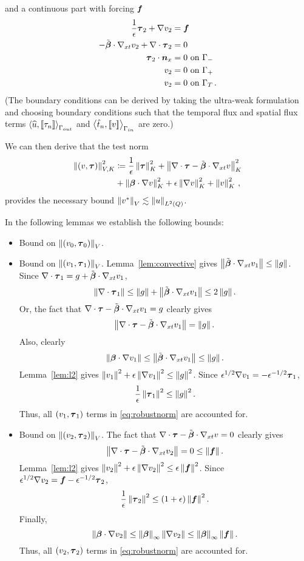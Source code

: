 \documentclass{article}
\begin{document}
and a continuous part with forcing $\boldsymbol f$
\begin{align*}
\frac{1}{\epsilon}\boldsymbol\tau_2+\nabla v_2 &=\boldsymbol f\\
-\tilde{\boldsymbol\beta}\cdot\nabla_{xt} v_2 + \nabla\cdot\boldsymbol\tau_2 &= 0\\
\boldsymbol\tau_2\cdot\boldsymbol n_x &= 0 \text{ on } \Gamma_-\\
v_2 &= 0 \text{ on } \Gamma_+\\
v_2 &= 0 \text{ on } \Gamma_T\,.
\end{align*}
(The boundary conditions can be derived by taking the ultra-weak formulation and choosing boundary conditions such that the temporal flux and spatial flux terms $\left\langle \widehat{u}, \left[ \![\tau_n]\! \right] \right\rangle_{\Gamma_{out}}$ and $\left\langle \hat t_n,\left[ \![v]\! \right] \right\rangle_{\Gamma_{in}}$ are zero.)

We can then derive that the test norm
\begin{align}
\label{eq:robustnorm}
\left\| \left( v,\boldsymbol\tau \right) \right\|_{V,K}^2 &\coloneqq
\frac{1}{\epsilon}\left\| \boldsymbol\tau \right\|_K^2
+ \left\| \nabla\cdot \boldsymbol\tau - \tilde{\boldsymbol\beta}\cdot\nabla_{xt} v \right\|_K^2 \nonumber\\
&+\left\| \boldsymbol\beta\cdot \nabla v \right\|_K^2
+ \epsilon\left\| \nabla v \right\|_K^2
+ \left\| v \right\|^2_K\,,
\end{align}
provides the necessary bound $\left\| v^* \right\|_V \lesssim \left\| u \right\|_{L^2\left( Q \right)}$.

In the following lemmas we establish the following bounds:
\begin{itemize}
\item Bound on $\left\| \left( v_0,\boldsymbol\tau_0 \right) \right\|_V$.
\item Bound on $\left\| \left( v_1,\boldsymbol\tau_1 \right) \right\|_V$. 
Lemma~\ref{lem:convective} gives $\left\| \tilde{\boldsymbol\beta}\cdot\nabla_{xt} v_1 \right\|\leq\left\| g \right\|$.
Since $\nabla\cdot\boldsymbol\tau_1=g+\tilde{\boldsymbol\beta}\cdot\nabla_{xt} v_1$, 
\[
\left\| \nabla\cdot\boldsymbol\tau_1 \right\|\leq\left\| g \right\|+\left\| \tilde{\boldsymbol\beta}\cdot\nabla_{xt} v_1 \right\|\leq 2\left\| g \right\|.
\]
Or, the fact that $\nabla\cdot\boldsymbol\tau-\tilde{\boldsymbol\beta}\cdot\nabla_{xt} v_1=g$ clearly gives
\[
\left\| \nabla\cdot \boldsymbol\tau - \tilde{\boldsymbol\beta}\cdot\nabla_{xt} v_1 \right\|=\left\| g \right\|.
\]
Also, clearly
\[
\left\| \boldsymbol\beta\cdot\nabla v_1 \right\|\leq\left\| \tilde{\boldsymbol\beta}\cdot\nabla_{xt} v_1 \right\|\leq\left\| g \right\|.
\]
Lemma~\ref{lem:l2} gives $\left\| v_1 \right\|^2+\epsilon\left\| \nabla v_1 \right\|^2\leq\left\| g \right\|^2$.
Since $\epsilon^{1/2}\nabla v_1=-\epsilon^{-1/2}\boldsymbol\tau_1$,
\[
\frac{1}{\epsilon}\left\| \boldsymbol\tau_1 \right\|^2\leq\left\| g \right\|^2.
\]
Thus, all $(v_1,\boldsymbol\tau_1)$ terms in \eqref{eq:robustnorm} are accounted for.
\item Bound on $\left\| \left( v_2,\boldsymbol\tau_2 \right) \right\|_V$. 
The fact that $\nabla\cdot\boldsymbol\tau-\tilde{\boldsymbol\beta}\cdot\nabla_{xt} v=0$ clearly gives
\[
\left\| \nabla\cdot \boldsymbol\tau - \tilde{\boldsymbol\beta}\cdot\nabla_{xt} v_2 \right\|=0\leq\left\| \boldsymbol f \right\|.
\]
Lemma~\ref{lem:l2} gives $\left\| v_2 \right\|^2+\epsilon\left\| \nabla v_2 \right\|^2\leq\epsilon\left\| \boldsymbol f \right\|^2$.
Since $\epsilon^{1/2}\nabla v_2=\boldsymbol f-\epsilon^{-1/2}\boldsymbol\tau_2$,
\[
\frac{1}{\epsilon}\left\| \boldsymbol\tau_2 \right\|^2\leq(1+\epsilon)\left\| \boldsymbol f \right\|^2.
\]
Finally,
\[
\left\| \boldsymbol\beta\cdot\nabla v_2 \right\|\leq\left\| \boldsymbol\beta \right\|_\infty\left\| \nabla v_2 \right\|\leq\left\| \boldsymbol\beta \right\|_\infty\left\| \boldsymbol f \right\|.
\]
Thus, all $(v_2,\boldsymbol\tau_2)$ terms in \eqref{eq:robustnorm} are accounted for.
\end{itemize}
\end{document}
